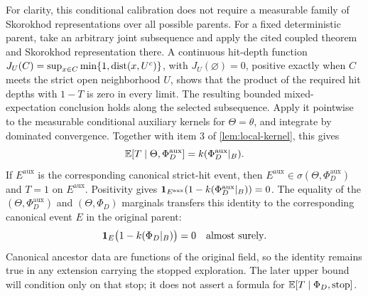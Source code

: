 For clarity, this conditional calibration does not require a measurable
family of Skorokhod representations over all possible parents. For a
fixed deterministic parent, take an arbitrary joint subsequence and
apply the cited coupled theorem and Skorokhod representation there.
A continuous hit-depth function
\(J_U(C)=\sup_{x\in C}\min\{1,\operatorname{dist}(x,U^c)\}\), with \(J_U(\varnothing)=0\), positive exactly
when \(C\) meets the strict open neighborhood \(U\), shows that the
product of the required hit depths with \(1-T\) is zero in every limit.
The resulting bounded
mixed-expectation conclusion holds along the selected subsequence.
Apply it pointwise to the measurable conditional auxiliary kernels
for \(\Theta=\theta\), and integrate by dominated convergence.
Together with item 3 of \cref{lem:local-kernel}, this gives
\[
       \mathbb E[T\mid\Theta,\Phi_D^{\mathrm{aux}}]
                      =k(\Phi_D^{\mathrm{aux}}|_B).
\]
If \(E^{\mathrm{aux}}\) is the corresponding canonical strict-hit event,
then \(E^{\mathrm{aux}}\in\sigma(\Theta,\Phi_D^{\mathrm{aux}})\) and
\(T=1\) on \(E^{\mathrm{aux}}\). Positivity gives
\(\mathbf 1_{E^{\mathrm{aux}}}(1-k(\Phi_D^{\mathrm{aux}}|_B))=0\).
The equality of the \((\Theta,\Phi_D^{\mathrm{aux}})\) and
\((\Theta,\Phi_D)\) marginals transfers this identity to the corresponding
canonical event \(E\) in the original parent:
\begin{equation}
             \mathbf 1_E\bigl(1-k(\Phi_D|_B)\bigr)=0
             \quad\hbox{almost surely}.
 \label{eq:kernel-forcing}
\end{equation}
Canonical ancestor data are
functions of the original field, so the identity remains true in
any extension carrying the stopped exploration. The later upper
bound will condition only on that stop; it does not assert a formula
for \(\mathbb E[T\mid\Phi_D,\text{stop}]\).

